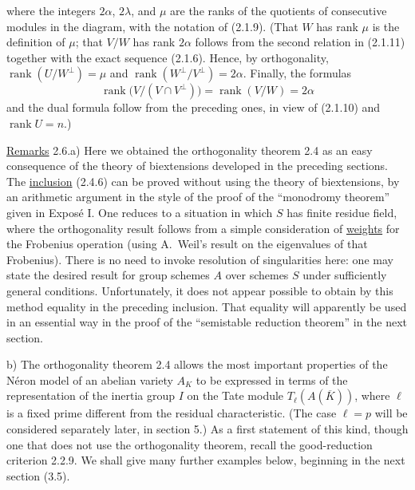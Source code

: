 where the integers $2\alpha$, $2\lambda$, and $\mu$ are the ranks of
the quotients of consecutive modules in the diagram, with the notation
of (2.1.9).  (That $W$ has rank $\mu$ is the definition of $\mu$; that
$V/W$ has rank $2\alpha$ follows from the second relation in (2.1.11)
together with the exact sequence (2.1.6).  Hence, by orthogonality,
$\operatorname{rank}(U/W^\perp)=\mu$ and
$\operatorname{rank}(W^\perp/V^\perp)=2\alpha$.  Finally, the formulas
\begin{equation}\tag{2.5.5}
 \operatorname{rank}\bigl(V/(V\cap V^\perp)\bigr)
 =\operatorname{rank}(V/W)=2\alpha
\end{equation}
and the dual formula follow from the preceding ones, in view of
(2.1.10) and $\operatorname{rank}U=n$.)

\medskip
\noindent
\underline{Remarks} 2.6.\quad a) Here we obtained the orthogonality
theorem 2.4 as an easy consequence of the theory of biextensions
developed in the preceding sections.  The \underline{inclusion}
(2.4.6) can be proved without using the theory of biextensions, by an
arithmetic argument in the style of the proof of the ``monodromy
theorem'' given in Expos\'e I.  One reduces to a situation in which $S$
has finite residue field, where the orthogonality result follows from a
simple consideration of \underline{weights} for the Frobenius operation
(using A.~Weil's result on the eigenvalues of that Frobenius).  There is
no need to invoke resolution of singularities here: one may state the
desired result for group schemes $A$ over schemes $S$ under sufficiently
general conditions.  Unfortunately, it does not appear possible to
obtain by this method equality in the preceding inclusion.  That
equality will apparently be used in an essential way in the proof of
the ``semistable reduction theorem'' in the next section.

\smallskip
\noindent
b) The orthogonality theorem 2.4 allows the most important properties
of the N\'{e}ron model of an abelian variety $A_K$ to be expressed in
terms of the representation of the inertia group $I$ on the Tate module
$T_\ell(A(\overline K))$, where $\ell$ is a fixed prime different from
the residual characteristic.  (The case $\ell=p$ will be considered
separately later, in section 5.)  As a first statement of this kind,
though one that does not use the orthogonality theorem, recall the
good-reduction criterion 2.2.9.  We shall give many further examples
below, beginning in the next section (3.5).
